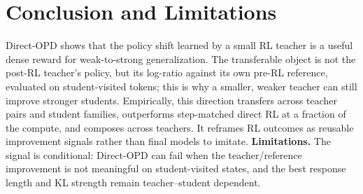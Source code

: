 \documentclass[]{gensi}
\newcommand{\method}{Direct-OPD}
\begin{document}
\section{Conclusion and Limitations}

\method{} shows that the policy shift learned by a small RL teacher is a useful
dense reward for weak-to-strong generalization. The transferable object is not
the post-RL teacher's policy, but its log-ratio against its own pre-RL reference,
evaluated on student-visited tokens; this is why a smaller, weaker teacher can
still improve stronger students. Empirically, this direction transfers across
teacher pairs and student families, outperforms step-matched direct RL at a
fraction of the compute, and composes across teachers. It reframes RL outcomes as
reusable improvement signals rather than final models to imitate.
\textbf{Limitations.} The signal is conditional: \method{} can fail when the
teacher/reference improvement is not meaningful on student-visited states, and
the best response length and KL strength remain teacher--student dependent.

\newpage




\newpage

\end{document}
